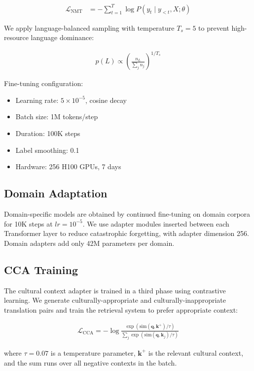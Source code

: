 \documentclass[11pt,twocolumn]{article}
\begin{document}
\begin{align}
  \mathcal{L}_{\text{NMT}} &= -\sum_{t=1}^{T} \log P(y_t \mid y_{<t}, X; \theta)
\end{align}

We apply language-balanced sampling with temperature $T_s = 5$ to prevent
high-resource language dominance:

\begin{align}
  p(L) \propto \left(\frac{n_L}{\sum_j n_j}\right)^{1/T_s}
\end{align}

Fine-tuning configuration:
\begin{itemize}[leftmargin=*,noitemsep]
  \item Learning rate: $5 \times 10^{-5}$, cosine decay
  \item Batch size: 1M tokens/step
  \item Duration: 100K steps
  \item Label smoothing: 0.1
  \item Hardware: 256 H100 GPUs, 7 days
\end{itemize}

\subsection{Domain Adaptation}

Domain-specific models are obtained by continued fine-tuning on domain corpora
for 10K steps at $lr = 10^{-5}$. We use adapter modules \citep{houlsby2019parameter}
inserted between each Transformer layer to reduce catastrophic forgetting,
with adapter dimension 256. Domain adapters add only 42M parameters per domain.

\subsection{CCA Training}

The cultural context adapter is trained in a third phase using contrastive
learning. We generate culturally-appropriate and culturally-inappropriate
translation pairs and train the retrieval system to prefer appropriate context:

\begin{align}
  \mathcal{L}_{\text{CCA}} = -\log \frac{\exp(\text{sim}(\mathbf{q}, \mathbf{k}^+)/\tau)}{\sum_j \exp(\text{sim}(\mathbf{q}, \mathbf{k}_j)/\tau)}
\end{align}

where $\tau = 0.07$ is a temperature parameter, $\mathbf{k}^+$ is the relevant
cultural context, and the sum runs over all negative contexts in the batch.
\end{document}
